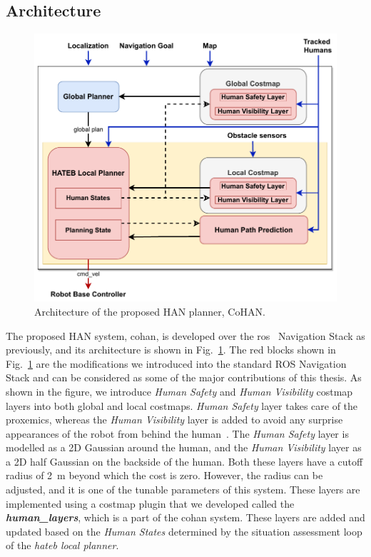 \subsection{Architecture}
\begin{figure}[h!]
    \centering
    \includegraphics[width=0.9\columnwidth]{images/chapter4/arch_new.pdf}
    \caption{Architecture of the proposed HAN planner, CoHAN.}
    \label{fig:block_diag}
\end{figure}
The proposed HAN system, \acrshort{cohan}, is developed over the \acrshort{ros}~\cite{quigley2009ros} Navigation Stack as previously, and its architecture is shown in Fig.~\ref{fig:block_diag}. The red blocks shown in Fig.~\ref{fig:block_diag} are the modifications we introduced into the standard ROS Navigation Stack and can be considered as some of the major contributions of this thesis. As shown in the figure, we introduce \textit{Human Safety} and \textit{Human Visibility} costmap layers into both global and local costmaps. \textit{Human Safety} layer takes care of the proxemics, whereas the \textit{Human Visibility} layer is added to avoid any surprise appearances of the robot from behind the human~\cite{sisbot_tr_2007}. The \textit{Human Safety} layer is modelled as a 2D Gaussian around the human, and the \textit{Human Visibility} layer as a 2D half Gaussian on the backside of the human. Both these layers have a cutoff radius of \SI{2}{\metre} beyond which the cost is zero. However, the radius can be adjusted, and it is one of the tunable parameters of this system. These layers are implemented using a costmap plugin that we developed called the \textit{\textbf{human\_layers}}, which is a part of the \acrshort{cohan} system. These layers are added and updated based on the \textit{Human States} determined by the situation assessment loop of the \textit{\acrshort{hateb} local planner}. 

